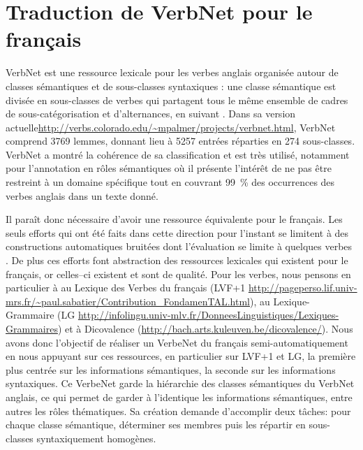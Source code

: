 \chapter{Traduction de VerbNet pour le français}
\label{ch:verbnet}

VerbNet est une ressource lexicale pour les verbes anglais organisée autour de classes sémantiques et de sous-classes syntaxiques : une classe sémantique est divisée en sous-classes de verbes qui partagent tous le même ensemble de cadres de sous-catégorisation et d'alternances, en suivant \cite{levin1993english}. Dans sa version actuelle\url{http://verbs.colorado.edu/~mpalmer/projects/verbnet.html}, VerbNet comprend 3769 lemmes, donnant lieu à 5257 entrées réparties en 274 sous-classes. VerbNet a montré la cohérence de sa classification et est très utilisé, notamment pour l'annotation en rôles sémantiques \citep{swier2005exploiting, palmer2013semantic} où il présente l'intérêt de ne pas être restreint à un domaine spécifique tout en couvrant 99~\% des occurrences des verbes anglais dans un texte donné.

Il paraît donc nécessaire d'avoir une ressource équivalente pour le français. Les seuls efforts qui ont été faits dans cette direction pour l'instant se limitent à des constructions automatiques bruitées dont l'évaluation se limite à quelques verbes \citep{messiant2010acquisition,falk2012classifying}. De plus ces efforts font abstraction des ressources lexicales qui existent pour le français, or celles–ci existent et sont de qualité. Pour les verbes, nous pensons en particulier à au Lexique des Verbes du français (LVF+1 \url{http://pageperso.lif.univ-mrs.fr/~paul.sabatier/Contribution_FondamenTAL.html}), au Lexique-Grammaire (LG \url{http://infolingu.univ-mlv.fr/DonneesLinguistiques/Lexiques-Grammaires}) et à Dicovalence (\url{http://bach.arts.kuleuven.be/dicovalence/}). Nous avons donc l'objectif de réaliser un VerbeNet du français semi-automatiquement en nous appuyant sur ces ressources, en particulier sur LVF+1 et LG, la première plus centrée sur les informations sémantiques, la seconde sur les informations syntaxiques. Ce VerbeNet garde la hiérarchie des classes sémantiques du VerbNet anglais, ce qui permet de garder à l'identique les informations sémantiques, entre autres les rôles thématiques. Sa création demande d'accomplir deux tâches: pour chaque classe sémantique, déterminer ses membres puis les répartir en sous-classes syntaxiquement homogènes.


